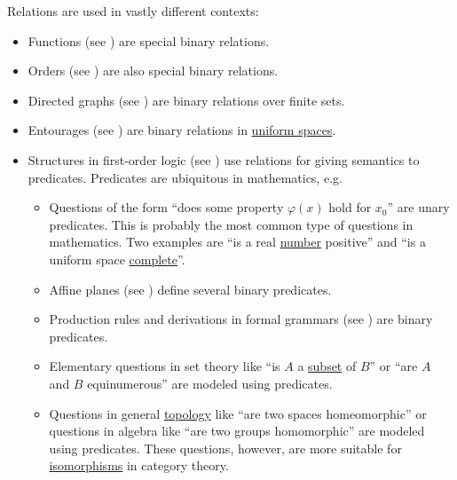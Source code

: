 \begin{example}\label{ex:relation}
  Relations are used in vastly different contexts:
  \begin{itemize}
    \item Functions (see ) are special binary relations.
    \item Orders (see ) are also special binary relations.
    \item Directed graphs (see ) are binary relations over finite sets.
    \item Entourages (see ) are binary relations in \hyperref[def:uniform_space]{uniform spaces}.
    \item Structures in first-order logic (see ) use relations for giving semantics to predicates. Predicates are ubiquitous in mathematics, e.g.
    \begin{itemize}
      \item Questions of the form \enquote{does some property \( \varphi(x) \) hold for \( x_0 \)} are unary predicates. This is probably the most common type of questions in mathematics. Two examples are \enquote{is a real \hyperref[def:real_numbers]{number} positive} and \enquote{is a uniform space \hyperref[def:complete_uniform_space]{complete}}.
      \item Affine planes (see ) define several binary predicates.
      \item Production rules and derivations in formal grammars (see ) are binary predicates.
      \item Elementary questions in set theory like \enquote{is \( A \) a \hyperref[def:subset]{subset} of \( B \)} or \enquote{are \( A \) and \( B \) equinumerous} are modeled using predicates.
      \item Questions in general \hyperref[sec:general_topology]{topology} like \enquote{are two spaces homeomorphic} or questions in algebra like \enquote{are two groups homomorphic} are modeled using predicates. These questions, however, are more suitable for \hyperref[def:morphism_invertibility/isomorphism]{isomorphisms} in category theory.
    \end{itemize}
  \end{itemize}
\end{example}

